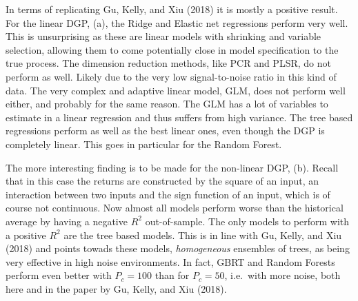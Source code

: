 \documentclass[]{article}
\begin{document}
In terms of replicating Gu, Kelly, and Xiu (2018) it is mostly a
positive result. For the linear DGP, (a), the Ridge and Elastic net
regressions perform very well. This is unsurprising as these are linear
models with shrinking and variable selection, allowing them to come
potentially close in model specification to the true process. The
dimension reduction methods, like PCR and PLSR, do not perform as well.
Likely due to the very low signal-to-noise ratio in this kind of data.
The very complex and adaptive linear model, GLM, does not perform well
either, and probably for the same reason. The GLM has a lot of variables
to estimate in a linear regression and thus suffers from high variance.
The tree based regressions perform as well as the best linear ones, even
though the DGP is completely linear. This goes in particular for the
Random Forest.

The more interesting finding is to be made for the non-linear DGP, (b).
Recall that in this case the returns are constructed by the square of an
input, an interaction between two inputs and the sign function of an
input, which is of course not continuous. Now almost all models perform
worse than the historical average by having a negative \(R^2\)
out-of-sample. The only models to perform with a positive \(R^2\) are
the tree based models. This is in line with Gu, Kelly, and Xiu (2018)
and points towads these models, \emph{homogeneous} ensembles of trees,
as being very effective in high noise environments. In fact, GBRT and
Random Forests perform even better with \(P_c=100\) than for \(P_c=50\),
i.e.~with more noise, both here and in the paper by Gu, Kelly, and Xiu
(2018).
\end{document}
